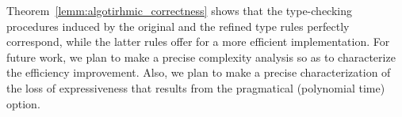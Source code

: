 Theorem~\ref{lemm:algotirhmic_correctness} shows that the type-checking procedures induced by the original and the refined type rules perfectly correspond,  while the latter rules offer for a more efficient implementation.
For future work, we plan to make a precise complexity analysis so as to characterize the efficiency improvement. Also, we plan to make a precise characterization of the loss of expressiveness that results from the pragmatical (polynomial time) option.













 